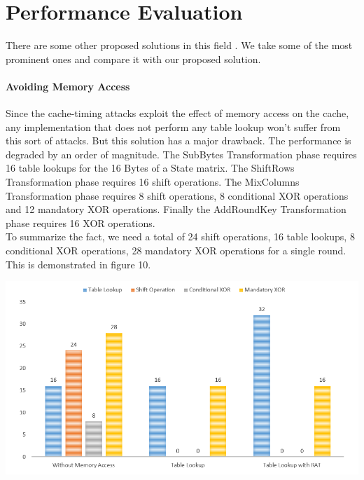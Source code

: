 \section{Performance Evaluation}

There are some other proposed solutions in this field \citep{osvik,paladi,rudra2001efficient,matsui2006far,matsui2007power,konighofer2008fast,meushaw2005device}. We take some of the most prominent ones and compare it with our proposed solution.\\

\paragraph{Avoiding Memory Access}
Since the cache-timing attacks exploit the effect of memory access on the cache, any implementation that does not perform any table lookup won't suffer from this sort of attacks. But this solution has a major drawback. The performance is degraded by an order of magnitude. The SubBytes Transformation phase requires 16 table lookups for the 16 Bytes of a State matrix. The ShiftRows Transformation phase requires 16 shift operations. The MixColumns Transformation phase requires 8 shift operations, 8 conditional XOR operations and 12 mandatory XOR operations. Finally the AddRoundKey Transformation phase requires 16 XOR operations.\\

To summarize the fact, we need a total of 24 shift operations, 16 table lookups, 8 conditional XOR operations, 28 mandatory XOR operations for a single round. This is demonstrated in figure 10.

\begin{center}
\includegraphics[scale=0.4,natwidth=902,natheight=493]{Figures/withnormal(new).png}
\label{fig: Comparison of RAT with Straightforward AES Implementation.}
\end{center}

